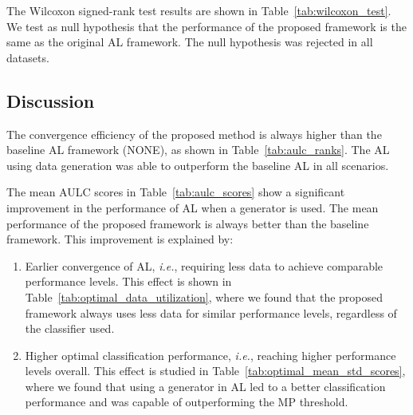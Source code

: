 \documentclass[preprint,12pt]{elsarticle}
\begin{document}
The Wilcoxon signed-rank test results are shown in
Table~\ref{tab:wilcoxon_test}. We test as null hypothesis that the performance
of the proposed framework is the same as the original AL framework. The null
hypothesis was rejected in all datasets.


\subsection{Discussion}

The convergence efficiency of the proposed method is always higher than the
baseline AL framework (NONE), as shown in Table~\ref{tab:aulc_ranks}. The AL
using data generation was able to outperform the baseline AL in all scenarios. 

The mean AULC scores in Table~\ref{tab:aulc_scores} show a significant
improvement in the performance of AL when a generator is used. The mean
performance of the proposed framework is always better than the
baseline framework. This improvement is explained by:

\begin{enumerate}
    \item Earlier convergence of AL, \textit{i.e.}, requiring less data to
        achieve comparable performance levels. This effect is shown in
        Table~\ref{tab:optimal_data_utilization}, where we found that the
        proposed framework always uses less data for similar performance
        levels, regardless of the classifier used.
    \item Higher optimal classification performance, \textit{i.e.}, reaching
        higher performance levels overall. This effect is studied in
        Table~\ref{tab:optimal_mean_std_scores}, where we found that using a
        generator in AL led to a better classification performance and was
        capable of outperforming the MP threshold. 
\end{enumerate} 
\end{document}
